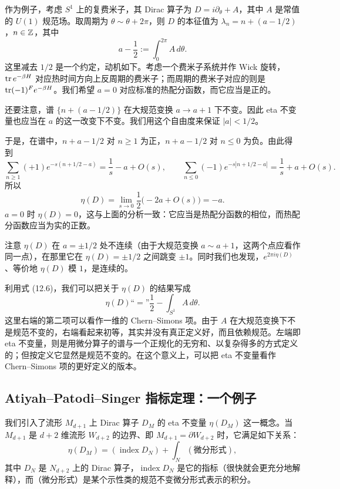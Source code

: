 作为例子，考虑 $S^1$ 上的复费米子，其 Dirac 算子为 $D=i\partial_\theta+A$，其中 $A$ 是常值的 $U(1)$ 规范场。取周期为 $\theta\sim\theta+2\pi$，则 $D$ 的本征值为 $\lambda_n=n+(a-1/2)$，$n\in\mathbb{Z}$，其中
\begin{equation}
  a-\frac{1}{2}:=\int_0^{2\pi}A\,d\theta .
  \tag{12.6}
\end{equation}
这里减去 $1/2$ 是一个约定，动机如下。考虑一个费米子系统并作 Wick 旋转，$\operatorname{tr} e^{-\beta H}$ 对应热时间方向上反周期的费米子；而周期的费米子对应的则是 $\operatorname{tr}(-1)^F e^{-\beta H}$。我们希望 $a=0$ 对应标准的热配分函数，而它应当是正的。

还要注意，谱 $\{n+(a-1/2)\}$ 在大规范变换 $a\to a+1$ 下不变。因此 eta 不变量也应当在 $a$ 的这一改变下不变。我们用这个自由度来保证 $|a|<1/2$。

于是，在谱中，$n+a-1/2$ 对 $n\ge1$ 为正，$n+a-1/2$ 对 $n\le0$ 为负。由此得到
\begin{equation}
  \sum_{n\ge1}(+1)e^{-s(n+1/2-a)}=\frac{1}{s}-a+O(s),\qquad
  \sum_{n\le0}(-1)e^{-s|n+1/2-a|}=\frac{1}{s}+a+O(s).
  \tag{12.7}
\end{equation}
所以
\begin{equation}
  \eta(D)=\lim_{s\to0}\frac{1}{2}\bigl(-2a+O(s)\bigr)=-a .
  \tag{12.8}
\end{equation}
$a=0$ 时 $\eta(D)=0$，这与上面的分析一致：它应当是热配分函数的相位，而热配分函数应当为实的正数。

注意 $\eta(D)$ 在 $a=\pm1/2$ 处不连续（由于大规范变换 $a\sim a+1$，这两个点应看作同一点），在那里它在 $\eta(D)=\pm1/2$ 之间跳变 $\pm1$。同时我们也发现，$e^{2\pi i\eta(D)}$、等价地 $\eta(D)$ 模 $1$，是连续的。

利用式 (12.6)，我们可以把关于 $\eta(D)$ 的结果写成
\begin{equation}
  \eta(D)\text{“}=\text{”}\frac{1}{2}-\int_{S^1}A\,d\theta .
  \tag{12.9}
\end{equation}
这里右端的第二项可以看作一维的 Chern--Simons 项。由于 $A$ 在大规范变换下不是规范不变的，右端看起来初等，其实并没有真正定义好，而且依赖规范。左端即 eta 不变量，则是用微分算子的谱与一个正规化的无穷和、以复杂得多的方式定义的；但按定义它显然是规范不变的。在这个意义上，可以把 eta 不变量看作 Chern--Simons 项的更好定义的版本。

\subsection{Atiyah--Patodi--Singer 指标定理：一个例子}

我们引入了流形 $M_{d+1}$ 上 Dirac 算子 $D_M$ 的 eta 不变量 $\eta(D_M)$ 这一概念。当 $M_{d+1}$ 是 $d+2$ 维流形 $W_{d+2}$ 的边界、即 $M_{d+1}=\partial W_{d+2}$ 时，它满足如下关系：
\begin{equation}
  \eta(D_M)=(\operatorname{index}D_N)+\int_N(\text{微分形式}),
  \tag{12.10}
\end{equation}
其中 $D_N$ 是 $N_{d+2}$ 上的 Dirac 算子，$\operatorname{index}D_N$ 是它的指标（很快就会更充分地解释），而（微分形式）是某个示性类的规范不变微分形式表示的积分。

